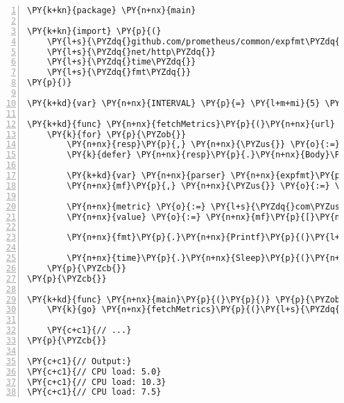 \begin{Verbatim}[commandchars=\\\{\},numbers=left,firstnumber=1,stepnumber=1,frame=single]
\PY{k+kn}{package} \PY{n+nx}{main}

\PY{k+kn}{import} \PY{p}{(}
	\PY{l+s}{\PYZdq{}github.com/prometheus/common/expfmt\PYZdq{}}
	\PY{l+s}{\PYZdq{}net/http\PYZdq{}}
	\PY{l+s}{\PYZdq{}time\PYZdq{}}
	\PY{l+s}{\PYZdq{}fmt\PYZdq{}}
\PY{p}{)}

\PY{k+kd}{var} \PY{n+nx}{INTERVAL} \PY{p}{=} \PY{l+m+mi}{5} \PY{o}{*} \PY{n+nx}{time}\PY{p}{.}\PY{n+nx}{Second}

\PY{k+kd}{func} \PY{n+nx}{fetchMetrics}\PY{p}{(}\PY{n+nx}{url} \PY{k+kt}{string}\PY{p}{)} \PY{p}{\PYZob{}}
	\PY{k}{for} \PY{p}{\PYZob{}}
		\PY{n+nx}{resp}\PY{p}{,} \PY{n+nx}{\PYZus{}} \PY{o}{:=} \PY{n+nx}{http}\PY{p}{.}\PY{n+nx}{Get}\PY{p}{(}\PY{n+nx}{url}\PY{p}{)}
		\PY{k}{defer} \PY{n+nx}{resp}\PY{p}{.}\PY{n+nx}{Body}\PY{p}{.}\PY{n+nx}{Close}\PY{p}{(}\PY{p}{)}

		\PY{k+kd}{var} \PY{n+nx}{parser} \PY{n+nx}{expfmt}\PY{p}{.}\PY{n+nx}{TextParser}
		\PY{n+nx}{mf}\PY{p}{,} \PY{n+nx}{\PYZus{}} \PY{o}{:=} \PY{n+nx}{parser}\PY{p}{.}\PY{n+nx}{TextToMetricFamilies}\PY{p}{(}\PY{n+nx}{resp}\PY{p}{.}\PY{n+nx}{Body}\PY{p}{)}

		\PY{n+nx}{metric} \PY{o}{:=} \PY{l+s}{\PYZdq{}com\PYZus{}hivemq\PYZus{}system\PYZus{}os\PYZus{}global\PYZus{}cpu\PYZus{}total\PYZus{}total\PYZdq{}}
		\PY{n+nx}{value} \PY{o}{:=} \PY{n+nx}{mf}\PY{p}{[}\PY{n+nx}{metric}\PY{p}{]}\PY{p}{.}\PY{n+nx}{GetMetric}\PY{p}{(}\PY{p}{)}\PY{p}{[}\PY{l+m+mi}{0}\PY{p}{]}\PY{p}{.}\PY{n+nx}{Gauge}\PY{p}{.}\PY{n+nx}{GetValue}\PY{p}{(}\PY{p}{)}

		\PY{n+nx}{fmt}\PY{p}{.}\PY{n+nx}{Printf}\PY{p}{(}\PY{l+s}{\PYZdq{}CPU load: \PYZpc{}.1f\PYZbs{}n\PYZdq{}}\PY{p}{,} \PY{n+nx}{value}\PY{p}{)}

		\PY{n+nx}{time}\PY{p}{.}\PY{n+nx}{Sleep}\PY{p}{(}\PY{n+nx}{INTERVAL}\PY{p}{)}
	\PY{p}{\PYZcb{}}
\PY{p}{\PYZcb{}}

\PY{k+kd}{func} \PY{n+nx}{main}\PY{p}{(}\PY{p}{)} \PY{p}{\PYZob{}}
	\PY{k}{go} \PY{n+nx}{fetchMetrics}\PY{p}{(}\PY{l+s}{\PYZdq{}http://localhost:9399/metrics\PYZdq{}}\PY{p}{)}

	\PY{c+c1}{// ...}
\PY{p}{\PYZcb{}}

\PY{c+c1}{// Output:}
\PY{c+c1}{// CPU load: 5.0}
\PY{c+c1}{// CPU load: 10.3}
\PY{c+c1}{// CPU load: 7.5}
\end{Verbatim}
